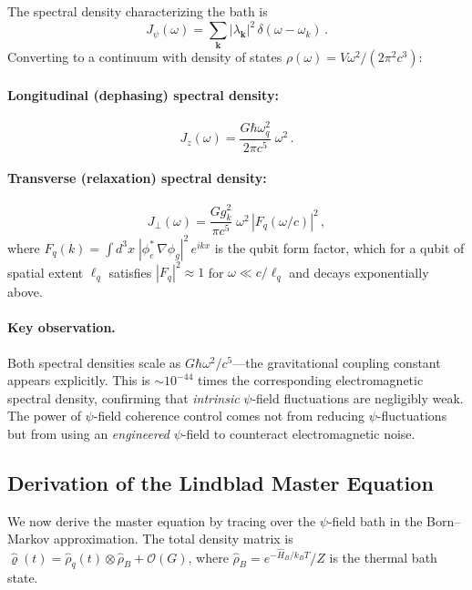 \documentclass[aps,prl,twocolumn,superscriptaddress,nofootinbib,longbibliography]{revtex4-2}
\newcommand{\order}[1]{\mathcal{O}(#1)}
\begin{document}
The spectral density characterizing the bath is
\begin{equation}\label{eq:spectral-density}
J_\psi(\omega) = \sum_\mathbf{k} |\lambda_\mathbf{k}|^2\,
\delta(\omega - \omega_k)\,.
\end{equation}
Converting to a continuum with density of states
$\rho(\omega) = V\omega^2/(2\pi^2 c^3)$:

\paragraph{Longitudinal (dephasing) spectral density:}
\begin{equation}\label{eq:Jz}
J_z(\omega) = \frac{G\hbar\omega_q^2}{2\pi c^5}\;\omega^2\,.
\end{equation}

\paragraph{Transverse (relaxation) spectral density:}
\begin{equation}\label{eq:Jperp}
J_\perp(\omega) = \frac{G g_k^2}{\pi c^5}\;
\omega^2\,|F_q(\omega/c)|^2\,,
\end{equation}
where $F_q(k) = \int d^3x\;|\phi_e^*\,\nabla\phi_g|^2\,e^{ikx}$ is the
qubit form factor, which for a qubit of spatial extent $\ell_q$ satisfies
$|F_q|^2 \approx 1$ for $\omega \ll c/\ell_q$ and decays exponentially
above.

\paragraph{Key observation.} Both spectral densities scale as
$G\hbar\omega^2/c^5$---the gravitational coupling constant appears
explicitly. This is $\sim 10^{-44}$ times the corresponding
electromagnetic spectral density, confirming that \emph{intrinsic}
$\psi$-field fluctuations are negligibly weak. The power of $\psi$-field
coherence control comes not from reducing $\psi$-fluctuations but from
using an \emph{engineered} $\psi$-field to counteract electromagnetic
noise.

\subsection{Derivation of the Lindblad Master Equation}

We now derive the master equation by tracing over the $\psi$-field bath
in the Born--Markov approximation. The total density matrix is
$\hat{\varrho}(t) = \hat{\rho}_q(t) \otimes \hat{\rho}_B + \order{G}$,
where $\hat{\rho}_B = e^{-\hat{H}_B/k_BT}/Z$ is the thermal bath state.
\end{document}
